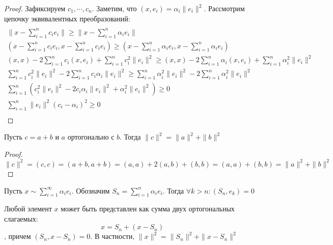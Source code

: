 \documentclass[document.tex]{subfiles}
\begin{document}
\begin{proof}
    Зафиксируем $c_1, \cdots, c_n$. Заметим, что $(x, e_i) = \alpha_i \|e_i\|^2$.
    Рассмотрим цепочку эквивалентных преобразований:
    \begin{multline*}\\
        \|x - \sum_{i = 1}^n c_i e_i\| \geq \|x - \sum_{i = 1}^n \alpha_i e_i\| \\
        (x - \sum_{i = 1}^n c_i e_i, x - \sum_{i = 1}^n c_i e_i) \geq (x - \sum_{i = 1}^n \alpha_i e_i, x - \sum_{i =
        1}^n \alpha_i e_i) \\
        (x, x) - 2 \sum_{i = 1}^n c_i (x, e_i) + \sum_{i = 1}^n c_i^2 \|e_i\|^2 \geq (x, x) - 2 \sum_{i = 1}^n \alpha_i
        (x, e_i) + \sum_{i = 1}^n \alpha_i^2 \|e_i\|^2 \\
        \sum_{i = 1}^n c_i^2 \|e_i\|^2 - 2 \sum_{i = 1}^n c_i \alpha_i \|e_i\|^2 \geq \sum_{i = 1}^n \alpha_i^2
        \|e_i\|^2 - 2 \sum_{i = 1}^n \alpha_i^2 \|e_i\|^2 \\
        \sum_{i = 1}^n \left( c_i^2 \|e_i\|^2 - 2 c_i \alpha_i \|e_i\|^2 + \alpha_i^2 \|e_i\|^2 \right) \geq 0\\
        \sum_{i = 1}^n \|e_i\|^2 (c_i - \alpha_i)^2 \geq 0\\
    \end{multline*}
\end{proof}

\begin{theorem}
    Пусть $c = a + b$ и $a$ ортогонально с $b$. Тогда $\|c\|^2 = \|a\|^2 + \|b\|^2$
\end{theorem}

\begin{proof}
    $\|c\|^2 = (c, c) = (a + b, a + b) = (a, a) + 2 (a, b) + (b, b) = (a, a) + (b, b) = \|a\|^2 + \|b\|^2$
\end{proof}

\begin{statement}
    Пусть $x \sim \sum_{i = 1}^{\infty} \alpha_i e_i$. Обозначим $S_n = \sum_{i = 1}^{n} \alpha_i e_i$. Тогда $\forall k
    > n: (S_n, e_k) = 0$
\end{statement}

\begin{lemma}
    Любой элемент $x$ может быть представлен как сумма двух ортогональных слагаемых:
    \[
        x = S_n + (x - S_n)
    \], причем $(S_n, x - S_n) = 0$. В частности, $\|x\|^2 = \|S_n\|^2 + \|x - S_n\|^2$
\end{lemma}
\end{document}
